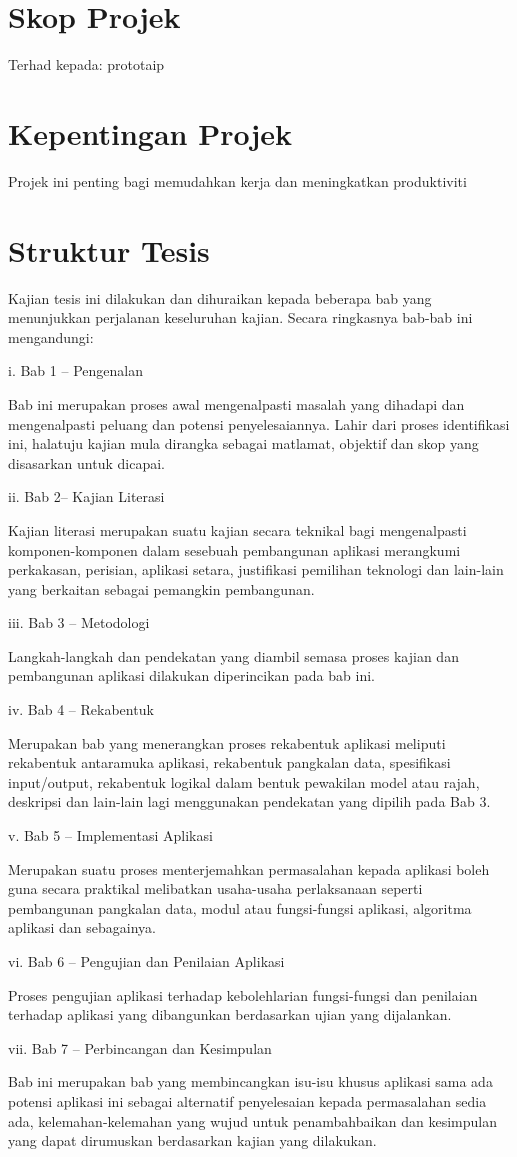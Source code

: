 \section{Skop Projek}
Terhad kepada:
prototaip

\section{Kepentingan Projek}
Projek ini penting bagi memudahkan kerja dan meningkatkan produktiviti

\section{Struktur Tesis}
Kajian tesis ini dilakukan dan dihuraikan kepada beberapa bab yang menunjukkan perjalanan keseluruhan kajian. Secara ringkasnya bab-bab ini mengandungi:

i. Bab 1 – Pengenalan

Bab ini merupakan proses awal mengenalpasti masalah yang dihadapi dan mengenalpasti peluang dan potensi penyelesaiannya. Lahir dari proses identifikasi ini, halatuju kajian mula dirangka sebagai matlamat, objektif dan skop yang disasarkan untuk dicapai.

ii. Bab 2– Kajian Literasi

Kajian literasi merupakan suatu kajian secara teknikal bagi mengenalpasti komponen-komponen dalam sesebuah pembangunan aplikasi merangkumi perkakasan, perisian, aplikasi setara, justifikasi pemilihan teknologi dan lain-lain yang berkaitan sebagai pemangkin pembangunan.

iii. Bab 3 – Metodologi

Langkah-langkah dan pendekatan yang diambil semasa proses kajian dan pembangunan aplikasi dilakukan diperincikan pada bab ini.

iv. Bab 4 – Rekabentuk

Merupakan bab yang menerangkan proses rekabentuk aplikasi meliputi rekabentuk antaramuka aplikasi, rekabentuk pangkalan data, spesifikasi input/output, rekabentuk logikal dalam bentuk pewakilan model atau rajah, deskripsi dan lain-lain lagi menggunakan pendekatan yang dipilih pada Bab 3.

v. Bab 5 –  Implementasi Aplikasi

Merupakan suatu proses menterjemahkan permasalahan kepada aplikasi boleh guna secara praktikal melibatkan usaha-usaha perlaksanaan seperti pembangunan pangkalan data, modul atau fungsi-fungsi aplikasi, algoritma aplikasi dan sebagainya.

vi. Bab 6 – Pengujian dan Penilaian Aplikasi

Proses pengujian aplikasi terhadap kebolehlarian fungsi-fungsi dan penilaian terhadap aplikasi yang dibangunkan berdasarkan ujian yang dijalankan.

vii. Bab 7 – Perbincangan dan Kesimpulan

Bab ini merupakan bab yang membincangkan isu-isu khusus aplikasi sama ada potensi aplikasi ini sebagai alternatif penyelesaian kepada permasalahan sedia ada, kelemahan-kelemahan yang wujud untuk penambahbaikan dan kesimpulan yang dapat dirumuskan berdasarkan kajian yang dilakukan.